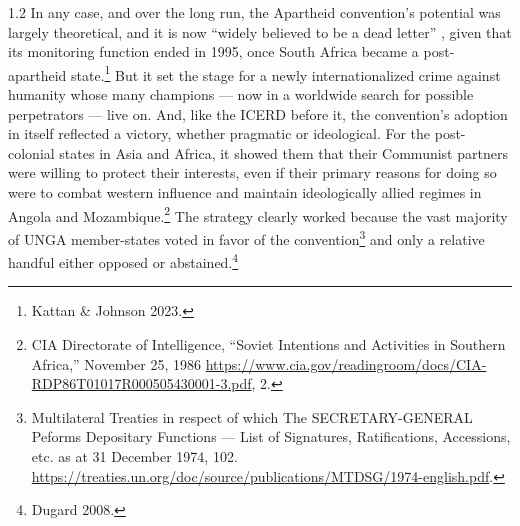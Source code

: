 \documentclass[../unravbook.tex]{subfiles}
\begin{document}
\begin{spacing}{1.2}
In any case, and over the long run, the Apartheid convention's potential was largely theoretical, and it is now \enquote{widely believed to be a dead letter} \parencite[86]{Lingaas-2015}, given that its monitoring function ended in 1995, once South Africa became a post-apartheid state.\footnote{Kattan \& Johnson 2023.} But it set the stage for a newly internationalized crime against humanity whose many champions --- now in a worldwide search for possible perpetrators --- live on. And, like the ICERD before it, the convention's adoption in itself reflected a victory, whether pragmatic or ideological. For the post-colonial states in Asia and Africa, it showed them that their Communist partners were willing to protect their interests, even if their primary reasons for doing so were to combat western influence \parencite[335--338]{Golan-1988} and maintain ideologically allied regimes in Angola and Mozambique.\footnote{CIA Directorate of Intelligence, \enquote{Soviet Intentions and Activities in Southern Africa,} November 25, 1986 \url{https://www.cia.gov/readingroom/docs/CIA-RDP86T01017R000505430001-3.pdf}, 2.} The strategy clearly worked because the vast majority of UNGA member-states voted in favor of the convention\footnote{Multilateral Treaties in respect of which The SECRETARY-GENERAL Peforms Depositary Functions --- List of Signatures, Ratifications, Accessions, etc. as at 31 December 1974, 102. \url{https://treaties.un.org/doc/source/publications/MTDSG/1974-english.pdf}.} and only a relative handful either opposed or abstained.\footnote{Dugard 2008.} 


\end{spacing}
\end{document}
